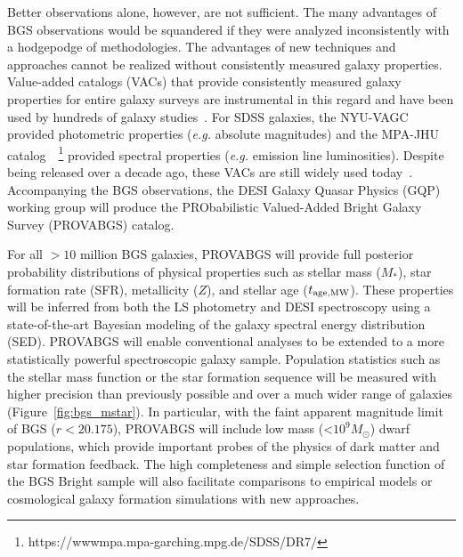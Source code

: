 Better observations alone, however, are not sufficient.  
The many advantages of BGS observations would be squandered if they were
analyzed inconsistently with a hodgepodge of methodologies.  
The advantages of new techniques and approaches cannot be realized without
consistently measured galaxy properties. 
Value-added catalogs (VACs) that provide consistently measured galaxy
properties for entire galaxy surveys are instrumental in this regard and have
been used by hundreds of galaxy studies~\citep[see][for a review]{blanton2009}.
For SDSS galaxies, the NYU-VAGC~\citep{blanton2005} provided photometric
properties (\emph{e.g.} absolute magnitudes) and the MPA-JHU
catalog~~\citep{brinchmann2004}\footnote{https://wwwmpa.mpa-garching.mpg.de/SDSS/DR7/}
provided spectral properties (\emph{e.g.} emission line luminosities).
Despite being released over a decade ago, these VACs are still widely used
today~\citep[\emph{e.g.}][]{alpaslan2021, odonnell2021, trevisan2021}. 
Accompanying the BGS observations, the DESI Galaxy Quasar Physics (GQP) working
group will produce the PRObabilistic Valued-Added Bright Galaxy Survey
(PROVABGS) catalog. 

For all ${>}10$ million BGS galaxies, PROVABGS will provide full posterior
probability distributions of physical properties such as stellar mass ($M_*$),
star formation rate (SFR), metallicity ($Z$), and stellar age ($t_{\rm age, MW}$). 
These properties will be inferred from both the LS photometry and DESI
spectroscopy using a state-of-the-art Bayesian modeling of the galaxy spectral
energy distribution (SED). 
PROVABGS will enable conventional analyses to be extended to a more
statistically powerful spectroscopic galaxy sample. 
Population statistics such as the stellar mass function or the star formation
sequence will be measured with higher precision than previously possible and
over a much wider range of galaxies (Figure~\ref{fig:bgs_mstar}). 
In particular, with the faint apparent magnitude limit of BGS ($r < 20.175$),
PROVABGS will include low mass (<$10^9M_\odot$) dwarf populations, which
provide important probes of the physics of dark matter and star formation
feedback.
The high completeness and simple selection function of the BGS Bright sample
will also facilitate comparisons to empirical models or cosmological galaxy 
formation simulations with new approaches. 

